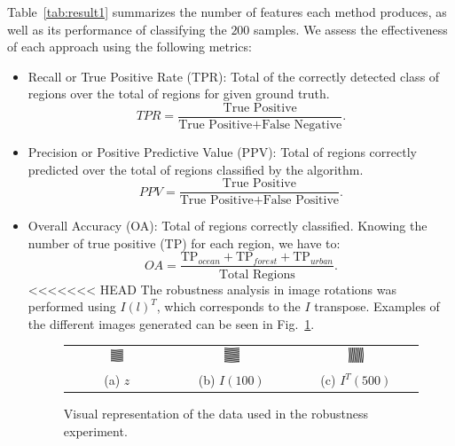 \documentclass[journal]{IEEEtran}
\begin{document}
Table~\ref{tab:result1} summarizes the number of features each method produces, as well as its performance of classifying the $200$ samples.
We assess the effectiveness of each approach using the following metrics: 
\begin{itemize}
	\item Recall or True Positive Rate (TPR): Total of the correctly detected class of regions over the total of regions for given ground truth.
	\begin{equation*}
	TPR = \frac{\text{True Positive}}{\text{True Positive} + \text{False Negative}}.
	\end{equation*}
	\item Precision or Positive Predictive Value (PPV): Total of regions correctly predicted over the total of regions classified by the algorithm.
	\begin{equation*}
	PPV = \frac{\text{True Positive}}{\text{True Positive} + \text{False Positive}}.
	\end{equation*}
	\item Overall Accuracy (OA): Total of regions correctly classified. 
	Knowing the number of true positive (TP) for each region, we have to:
	\begin{equation*}
	OA = \frac{\text{TP}_{ocean} + \text{TP}_{forest} + \text{TP}_{urban}}{\text{Total Regions}}.
	\end{equation*}
<<<<<<< HEAD
	The robustness analysis in image rotations was performed using $I(l)^T$, which corresponds to the $I$ transpose.
	Examples of the different images generated can be seen in Fig.~\ref{fig:speckle}.
	
	\begin{figure}[hbt]
		\begin{tabular}{ccc}
			\includegraphics[width=0.135\textwidth]{Figures/z.png} &   
			\includegraphics[width=0.135\textwidth]{Figures/z100.png} &
			\includegraphics[width=0.135\textwidth]{Figures/z500t.png} \\
			(a) $z$ &   
			(b) $I(100)$ &
			(c) $I^T(500)$ \\
		\end{tabular}
		\caption{Visual representation of the data used in the robustness experiment.}
		\label{fig:speckle}
	\end{figure}


\end{itemize}
\end{document}
